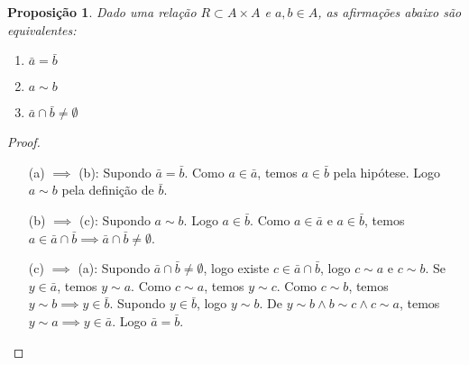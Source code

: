 \documentclass{article}
\newtheorem{prop}{Proposição}[section]
\theoremstyle{theorem}
\theoremstyle{lemma}
\theoremstyle{definition}
\theoremstyle{remark}
\begin{document}
\begin{prop}
	Dado uma relação $R \subset A \times A$ e $a,b\in A$, as afirmações abaixo são equivalentes:
	\begin{enumerate}[label = (\alph*)]
		\item  $\bar{a} = \bar{b}$
		\item  $ a\sim b$
		\item  $ \bar{a} \cap \bar{b} \neq \emptyset$
	\end{enumerate}
\end{prop}
\begin{proof}
	\begin{enumerate}[itemindent=36pt]
		\item[(a) $\implies$ (b):] Supondo $\bar{a} = \bar{b}$. Como $a\in \bar{a}$, temos $a\in \bar{b}$ pela hipótese. Logo $a \sim b$ pela definição de $\bar{b}$.
		\item[(b) $\implies$ (c):] Supondo $a\sim b$.  Logo $a\in \bar{b}$. Como $a\in \bar{a}$ e $a\in \bar{b}$, temos $a\in \bar{a} \cap \bar{b} \implies \bar{a} \cap \bar{b} \neq\emptyset$.
		\item[(c) $\implies$ (a):] Supondo $\bar{a} \cap \bar{b} \neq \emptyset$, logo existe $c\in  \bar{a} \cap \bar{b}$, logo $c\sim a$ e $c\sim b$. Se $y \in \bar{a}$, temos $ y\sim a$. Como $c\sim a$, temos $y\sim c$. Como $c\sim b$, temos $y\sim b \implies y\in \bar{b}$. Supondo $y\in \bar{b}$, logo $y\sim b$. De $y\sim b \land b\sim c \land c \sim a$, temos $y\sim a \implies y\in \bar{a}$. Logo $\bar{a} = \bar{b}$.
	\end{enumerate}
\end{proof}
\end{document}
